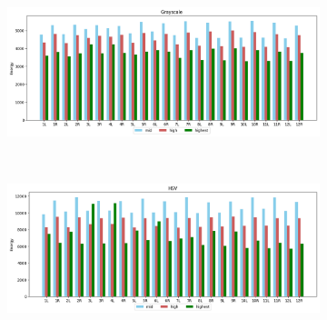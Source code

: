 \begin{figure}[H]
    \caption{Card STFT approach with Hann window for Grayscale (a) and HSV (b) colourspaces.}
    \centering
    \begin{subfigure}{\textwidth}
        \centering
        \includegraphics[scale=0.5]{images/appendix/stft/card/hann_Grayscale.png}
        \caption{}
    \end{subfigure}\\
    \begin{subfigure}{\textwidth}
         \centering
          \includegraphics[scale=0.5]{images/appendix/stft/card/hann_HSV.png}
          \caption{}
    \end{subfigure}
    \fautor
\end{figure}

